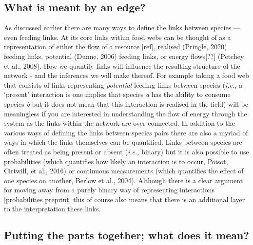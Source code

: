 \documentclass[
]{article}
\begin{document}
\subsection{What is meant by an edge?}\label{what-is-meant-by-an-edge}

As discussed earlier there are many ways to define the links between
species --- even feeding links. At its core links within food webs can
be thought of as a representation of either the flow of a resource
{[}ref{]}, realised (Pringle, 2020) feeding links, potential (Dunne,
2006) feeding links, or energy flows{[}??{]} (Petchey et al., 2008). How
we quantify links will influence the resulting structure of the network
- and the inferences we will make thereof. For example taking a food web
that consists of links representing \emph{potential} feeding links
between species (\emph{i.e.,} a `present' interaction is one implies
that species \emph{a} has the ability to consume species \emph{b} but it
does not mean that this interaction is realised in the field) will be
meaningless if you are interested in understanding the flow of energy
through the system as the links within the network are over connected.
In addition to the various ways of defining the links between species
pairs there are also a myriad of ways in which the links themselves can
be quantified. Links between species are often treated as being present
or absent (\emph{i.e.,} binary) but it is also possible to use
probabilities (which quantifies how likely an interaction is to occur,
Poisot, Cirtwill, et al., 2016) or continuous measurements (which
quantifies the effect of one species on another, Berlow et al., 2004).
Although there is a clear argument for moving away from a purely binary
way of representing interactions {[}probabilities preprint{]} this of
course also means that there is an additional layer to the
interpretation these links.

\subsection{Putting the parts together; what does it
mean?}\label{putting-the-parts-together-what-does-it-mean}
\end{document}

